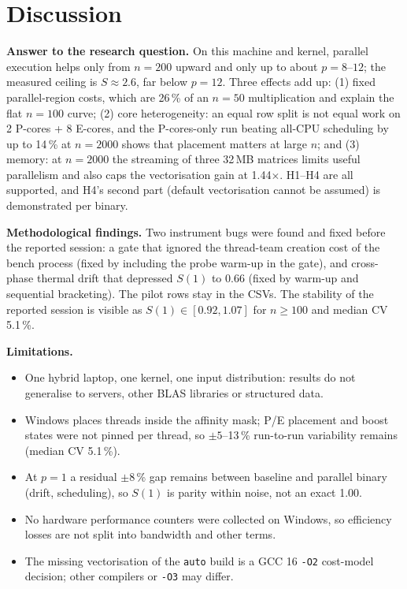 \documentclass[11pt,a4paper]{article}
\begin{document}
\section{Discussion}

\textbf{Answer to the research question.}
On this machine and kernel, parallel execution helps only from $n=200$
upward and only up to about $p=8$--$12$; the measured ceiling is
$S \approx 2.6$, far below $p=12$. Three effects add up: (1) fixed
parallel-region costs, which are 26\,\% of an $n=50$ multiplication and
explain the flat $n=100$ curve; (2) core heterogeneity: an equal row split
is not equal work on 2 P-cores + 8 E-cores, and the P-cores-only run beating
all-CPU scheduling by up to 14\,\% at $n=2000$ shows that placement matters
at large $n$; and (3) memory: at $n=2000$ the streaming of three 32\,MB
matrices limits useful parallelism and also caps the vectorisation gain at
1.44$\times$. H1--H4 are all supported, and H4's second part (default
vectorisation cannot be assumed) is demonstrated per binary.

\textbf{Methodological findings.}
Two instrument bugs were found and fixed before the reported session: a
gate that ignored the thread-team creation cost of the bench process (fixed
by including the probe warm-up in the gate), and cross-phase thermal drift
that depressed $S(1)$ to 0.66 (fixed by warm-up and sequential
bracketing). The pilot rows stay in the CSVs. The stability of the reported
session is visible as $S(1) \in [0.92, 1.07]$ for $n \ge 100$ and median CV
5.1\,\%.

\textbf{Limitations.}
\begin{itemize}
  \item One hybrid laptop, one kernel, one input distribution: results do
        not generalise to servers, other BLAS libraries or structured
        data.
  \item Windows places threads inside the affinity mask; P/E placement and
        boost states were not pinned per thread, so $\pm 5$--13\,\%
        run-to-run variability remains (median CV 5.1\,\%).
  \item At $p=1$ a residual $\pm 8$\,\% gap remains between baseline and
        parallel binary (drift, scheduling), so $S(1)$ is parity within
        noise, not an exact 1.00.
  \item No hardware performance counters were collected on Windows, so
        efficiency losses are not split into bandwidth and other terms.
  \item The missing vectorisation of the \texttt{auto} build is a GCC 16
        \texttt{-O2} cost-model decision; other compilers or \texttt{-O3}
        may differ.
\end{itemize}
\end{document}
